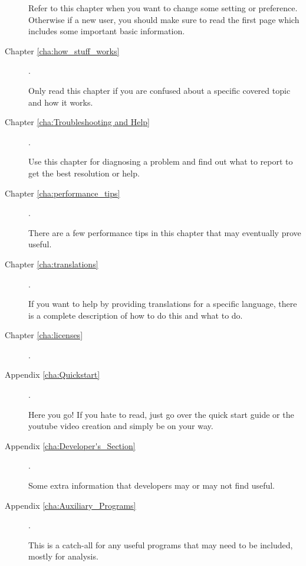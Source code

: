 \begin{description}
        Refer to this chapter when you want to change some setting or preference. 
        Otherwise if a new user, you should make sure to read the first page which includes some important basic information.  

    \item[Chapter \ref{cha:how_stuff_works}] .

        Only read this chapter if you are confused about a specific covered topic and how it works.

    \item[Chapter \ref{cha:Troubleshooting and Help}] .

        Use this chapter for diagnosing a problem and find out what to report to get the best resolution or help.

    \item[Chapter \ref{cha:performance_tips}]  .

        There are a few performance tips in this chapter that may eventually prove useful.

    \item[Chapter \ref{cha:translations}] .

        If you want to help by providing translations for a specific language, there is a complete description of how to do this and what to do.

    \item[Chapter \ref{cha:licenses}] .

    \item[Appendix \ref{cha:Quickstart}] .

        Here you go! If you hate to read, just go over the quick start guide or the youtube video creation and simply be on your way.

    \item[Appendix \ref{cha:Developer's_Section}] .

        Some extra information that developers may or may not find useful.

    \item[Appendix \ref{cha:Auxiliary_Programs}] .
    
        This is a catch-all for any useful programs that may need to be included, mostly for analysis.

\end{description}

